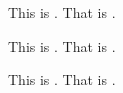\documentclass{article}
\begin{document}
This is \hellourl. That is \worldurl.

This is \hellourl. That is \worldurl.

This is \hellourl. That is \worldurl.
\end{document}
